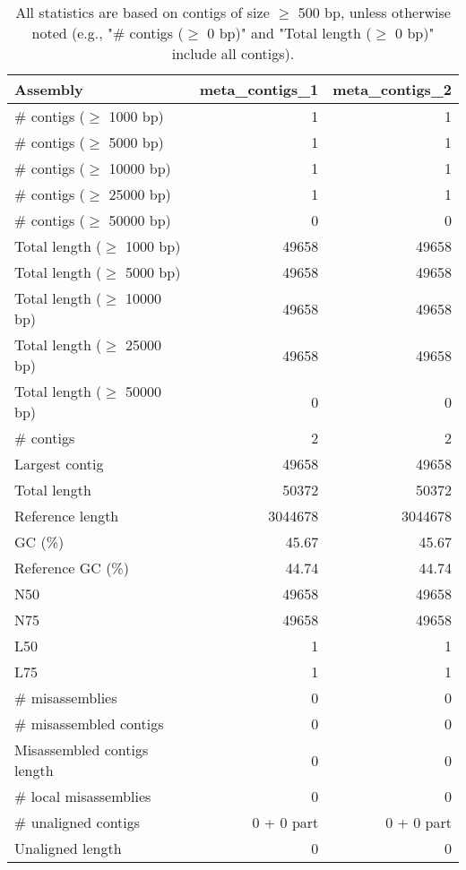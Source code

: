 \documentclass[12pt,a4paper]{article}
\begin{document}
\begin{table}[ht]
\begin{center}
\caption{All statistics are based on contigs of size $\geq$ 500 bp, unless otherwise noted (e.g., "\# contigs ($\geq$ 0 bp)" and "Total length ($\geq$ 0 bp)" include all contigs).}
\begin{tabular}{|l*{2}{|r}|}
\hline
Assembly & meta\_contigs\_1 & meta\_contigs\_2 \\ \hline
\# contigs ($\geq$ 1000 bp) & 1 & 1 \\ \hline
\# contigs ($\geq$ 5000 bp) & 1 & 1 \\ \hline
\# contigs ($\geq$ 10000 bp) & 1 & 1 \\ \hline
\# contigs ($\geq$ 25000 bp) & 1 & 1 \\ \hline
\# contigs ($\geq$ 50000 bp) & 0 & 0 \\ \hline
Total length ($\geq$ 1000 bp) & 49658 & 49658 \\ \hline
Total length ($\geq$ 5000 bp) & 49658 & 49658 \\ \hline
Total length ($\geq$ 10000 bp) & 49658 & 49658 \\ \hline
Total length ($\geq$ 25000 bp) & 49658 & 49658 \\ \hline
Total length ($\geq$ 50000 bp) & 0 & 0 \\ \hline
\# contigs & 2 & 2 \\ \hline
Largest contig & 49658 & 49658 \\ \hline
Total length & 50372 & 50372 \\ \hline
Reference length & 3044678 & 3044678 \\ \hline
GC (\%) & 45.67 & 45.67 \\ \hline
Reference GC (\%) & 44.74 & 44.74 \\ \hline
N50 & 49658 & 49658 \\ \hline
N75 & 49658 & 49658 \\ \hline
L50 & 1 & 1 \\ \hline
L75 & 1 & 1 \\ \hline
\# misassemblies & 0 & 0 \\ \hline
\# misassembled contigs & 0 & 0 \\ \hline
Misassembled contigs length & 0 & 0 \\ \hline
\# local misassemblies & 0 & 0 \\ \hline
\# unaligned contigs & 0 + 0 part & 0 + 0 part \\ \hline
Unaligned length & 0 & 0 \\ \hline

\end{tabular}
\end{center}
\end{table}
\end{document}
